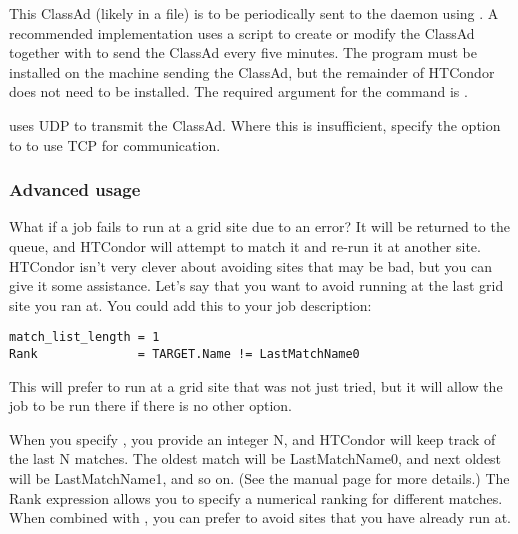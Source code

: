 
This ClassAd (likely in a file)
is to be periodically sent to the  daemon
using .
A recommended implementation uses a script to create or modify
the ClassAd together with
 to send the ClassAd every five minutes.
The  program must be installed on the 
machine sending the ClassAd, but the remainder of HTCondor
does not need to be installed.
The required argument for the  command
is .

 uses UDP to transmit the ClassAd.
Where this is insufficient,
specify the  option to 
to use TCP for communication. 

\subsubsection{Advanced usage}

What if a job fails to run at a grid site due to an error? It will be
returned to the queue, and HTCondor will attempt to match it and
re-run it at another site. HTCondor isn't very clever about avoiding
sites that may be bad, but you can give it some assistance. Let's say
that you want to avoid running at the last grid site you ran at. You
could add this to your job description:

\footnotesize
\begin{verbatim}
match_list_length = 1
Rank              = TARGET.Name != LastMatchName0
\end{verbatim}
\normalsize

This will prefer to run at a grid site that was not just tried, but it
will allow the job to be run there if there is no other option. 

When you specify , you provide an integer N, and
HTCondor will keep track of the last N matches. The oldest match will be
LastMatchName0, and next oldest will be LastMatchName1, and so on. (See
the  manual page for more details.) The Rank expression
allows you to specify a numerical ranking for different matches. When
combined with , you can prefer to avoid sites that
you have already run at. 

